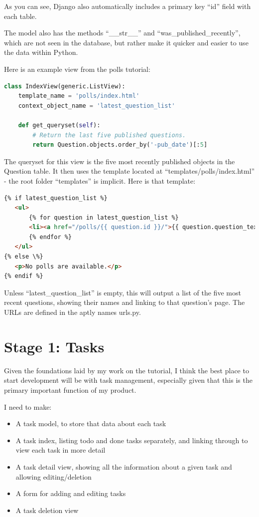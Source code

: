 \documentclass{article}
\begin{document}
As you can see,
Django also automatically includes a primary key ``id'' field with each table.

The model also has the methods ``\_\_str\_\_'' and ``was\_published\_recently'',
which are not seen in the database,
but rather make it quicker and easier to use the data within Python.

Here is an example view from the polls tutorial:
\begin{lstlisting}[language=Python, breaklines]
class IndexView(generic.ListView):
    template_name = 'polls/index.html'
    context_object_name = 'latest_question_list'

    def get_queryset(self):
        # Return the last five published questions.
        return Question.objects.order_by('-pub_date')[:5]
\end{lstlisting}

The queryset for this view is the five most recently published objects in the Question table.
It then uses the template located at ``templates/polls/index.html'' -
the root folder ``templates'' is implicit.
Here is that template:
\begin{lstlisting}[language=HTML, breaklines]
{% if latest_question_list %}
   <ul>
       {% for question in latest_question_list %}
       <li><a href="/polls/{{ question.id }}/">{{ question.question_text }}</a></li>
       {% endfor %}
   </ul>
{% else \%}
   <p>No polls are available.</p>
{% endif %}
\end{lstlisting}

Unless ``latest\_question\_list'' is empty,
this will output a list of the five most recent questions,
showing their names and linking to that question's page.
The URLs are defined in the aptly names urls.py.

\section{Stage 1: Tasks}
Given the foundations laid by my work on the tutorial,
I think the best place to start development will be with task management,
especially given that this is the primary important function of my product.

I need to make:
\begin{itemize}
\item A task model,
  to store that data about each task
\item A task index,
  listing todo and done tasks separately,
  and linking through to view each task in more detail
\item A task detail view,
  showing all the information about a given task and allowing editing/deletion
\item A form for adding and editing tasks
\item A task deletion view
\end{itemize}
\end{document}
